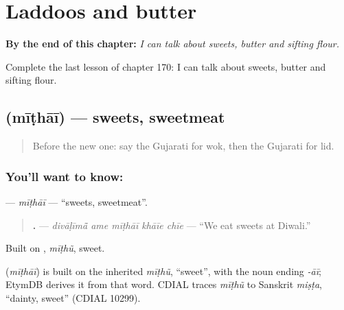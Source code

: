 
\chapter{Laddoos and butter}
\label{ch:gu-laddoos-and-butter}

\begin{chapteropening}
\textbf{By the end of this chapter:} \emph{I can talk about sweets, butter and sifting flour.}

Complete the last lesson of chapter 170: I can talk about sweets, butter and sifting flour.
\end{chapteropening}

\section[\texorpdfstring{\gu{મીઠાઈ} (mīṭhāī)}{મીઠાઈ (mīṭhāī)}]{ (mīṭhāī) — sweets, sweetmeat}

\label{lesson:GU-C170-mithai}



\begin{quote}
Before the new one: say the Gujarati for wok, then the Gujarati for lid.
\end{quote}

\subsection*{You'll want to know: }
\textbf{} — \emph{mīṭhāī} — \textquotedblleft{}sweets, sweetmeat\textquotedblright{}.

\begin{quote}
\textbf{    .} — \emph{divāḷīmā̃ ame mīṭhāī khāīe chīe} — \textquotedblleft{}We eat sweets at Diwali.\textquotedblright{}
\end{quote}

Built on \textbf{}, \emph{mīṭhũ}, sweet.

\begin{cousinweb}
\textbf{} (\emph{mīṭhāī}) is built on the inherited \emph{mīṭhũ}, \textquotedblleft{}sweet\textquotedblright{}, with the noun ending \emph{-āī}; EtymDB derives it from that word. CDIAL traces \emph{mīṭhũ} to Sanskrit \emph{miṣṭa}, \textquotedblleft{}dainty, sweet\textquotedblright{} (CDIAL 10299).
\end{cousinweb}

